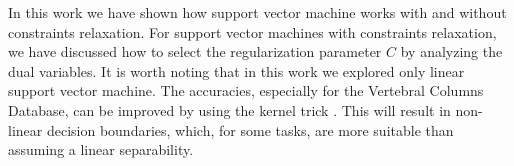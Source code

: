 \label{sec:conclusion}

In this work we have shown how support vector machine works with and without constraints relaxation.
For support vector machines with constraints relaxation, we have discussed how to select the regularization parameter $C$ by analyzing the dual variables.
It is worth noting that in this work we explored only linear support vector machine.
The accuracies, especially for the Vertebral Columns Database, can be improved by using the kernel trick \cite{bishop2006pattern}.
This will result in non-linear decision boundaries, which, for some tasks, are more suitable than assuming a linear separability.






